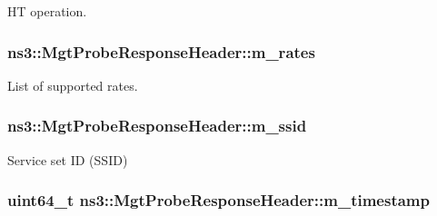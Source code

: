 HT operation. 

\subsubsection[{\texorpdfstring{m\+\_\+rates}{m_rates}}]{ ns3\+::\+Mgt\+Probe\+Response\+Header\+::m\+\_\+rates\hspace{0.3cm}{\ttfamily [private]}}\hypertarget{classns3_1_1MgtProbeResponseHeader_a830a4f67265f50c20a24e2977ee408ba}{}\label{classns3_1_1MgtProbeResponseHeader_a830a4f67265f50c20a24e2977ee408ba}


List of supported rates. 

\subsubsection[{\texorpdfstring{m\+\_\+ssid}{m_ssid}}]{ ns3\+::\+Mgt\+Probe\+Response\+Header\+::m\+\_\+ssid\hspace{0.3cm}{\ttfamily [private]}}\hypertarget{classns3_1_1MgtProbeResponseHeader_a68c26b26d0329128db85f8f151bdbfb6}{}\label{classns3_1_1MgtProbeResponseHeader_a68c26b26d0329128db85f8f151bdbfb6}


Service set ID (S\+S\+ID) 

\subsubsection[{\texorpdfstring{m\+\_\+timestamp}{m_timestamp}}]{\setlength{\rightskip}{0pt plus 5cm}uint64\+\_\+t ns3\+::\+Mgt\+Probe\+Response\+Header\+::m\+\_\+timestamp\hspace{0.3cm}{\ttfamily [private]}}\hypertarget{classns3_1_1MgtProbeResponseHeader_aeab17563c28389c4752246ee525d22af}{}\label{classns3_1_1MgtProbeResponseHeader_aeab17563c28389c4752246ee525d22af}



